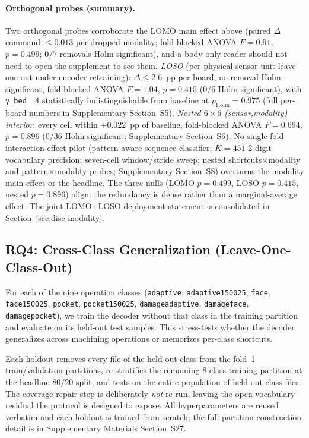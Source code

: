 \documentclass[sensors,article,submit,moreauthors,pdftex]{Definitions/mdpi}
\begin{document}
\paragraph{Orthogonal probes (summary).}\label{sec:abl-lomo-sensor-stub} Two orthogonal probes corroborate the LOMO main effect above (paired $\Delta$ command $\le 0.013$ per dropped modality; fold-blocked ANOVA $F\!=\!0.91$, $p\!=\!0.499$; $0/7$ removals Holm-significant), and a body-only reader should not need to open the supplement to see them. \emph{LOSO} (per-physical-sensor-unit leave-one-out under encoder retraining): $\Delta\!\le\!2.6$~pp per board, no removal Holm-significant, fold-blocked ANOVA $F\!=\!1.04$, $p\!=\!0.415$ ($0/6$ Holm-significant), with \texttt{y\_bed\_\_4} statistically indistinguishable from baseline at $p_{\text{Holm}}\!=\!0.975$ (full per-board numbers in Supplementary Section~S5). \emph{Nested $6\!\times\!6$ (sensor,modality) interior}: every cell within $\pm 0.022$~pp of baseline, fold-blocked ANOVA $F\!=\!0.694$, $p\!=\!0.896$ ($0/36$ Holm-significant; Supplementary Section~S6). No single-fold interaction-effect pilot (pattern-aware sequence classifier; $K\!=\!451$ 2-digit vocabulary precision; seven-cell window/stride sweep; nested shortcuts$\times$modality and pattern$\times$modality probes; Supplementary Section~S8) overturns the modality main effect or the headline. The three nulls (LOMO $p\!=\!0.499$, LOSO $p\!=\!0.415$, nested $p\!=\!0.896$) align: the redundancy is dense rather than a marginal-average effect. The joint LOMO+LOSO deployment statement is consolidated in Section~\ref{sec:disc-modality}.

\subsection{RQ4: Cross-Class Generalization (Leave-One-Class-Out)}
\label{sec:loco}

For each of the nine operation classes (\texttt{adaptive}, \texttt{adaptive150025}, \texttt{face}, \texttt{face150025}, \texttt{pocket}, \texttt{pocket150025}, \texttt{damageadaptive}, \texttt{damageface}, \texttt{damagepocket}), we train the decoder without that class in the training partition and evaluate on its held-out test samples. This stress-tests whether the decoder generalizes across machining operations or memorizes per-class shortcuts.

Each holdout removes every file of the held-out class from the fold~1 train/validation partitions, re-stratifies the remaining $8$-class training partition at the headline $80/20$ split, and tests on the entire population of held-out-class files. The coverage-repair step is deliberately \emph{not} re-run, leaving the open-vocabulary residual the protocol is designed to expose. All hyperparameters are reused verbatim and each holdout is trained from scratch; the full partition-construction detail is in Supplementary Materials Section~S27.
\end{document}
